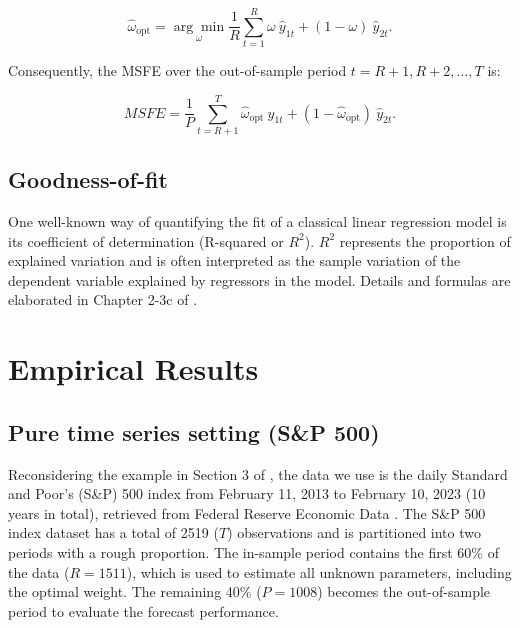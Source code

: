 \documentclass{monashthesis}
\begin{document}
\begin{equation}
\label{eqn:MSFE2}
\hat{\omega}_{\text{opt}} = \underset{\omega}{\arg\min} \frac{1}{R} \sum^R_{t=1} \omega \ \hat y_{1t} + (1-\omega) \ \hat y_{2t}.
\end{equation}

Consequently, the MSFE over the out-of-sample period \(t = R+1, R+2, \dots, T\) is:

\begin{equation}
\label{eqn:MSFE3}
MSFE = \frac{1}{P} \sum^T_{t = R+1} \hat{\omega}_{\text{opt}} \ \hat y_{1t} + (1-\hat{\omega}_{\text{opt}}) \ \hat y_{2t}.
\end{equation}

\hypertarget{goodness-of-fit}{%
\section{Goodness-of-fit}\label{goodness-of-fit}}

One well-known way of quantifying the fit of a classical linear regression model is its coefficient of determination (R-squared or \(R^2\)). \(R^2\) represents the proportion of explained variation and is often interpreted as the sample variation of the dependent variable explained by regressors in the model. Details and formulas are elaborated in Chapter 2-3c of \textcite{W15}.

\hypertarget{empirical-results}{%
\chapter{Empirical Results}\label{empirical-results}}

\hypertarget{sp500}{%
\section{Pure time series setting (S\&P 500)}\label{sp500}}

Reconsidering the example in Section 3 of \textcite{GA11}, the data we use is the daily Standard and Poor's (S\&P) 500 index from February 11, 2013 to February 10, 2023 (10 years in total), retrieved from Federal Reserve Economic Data \autocite{SP500}. The S\&P 500 index dataset has a total of 2519 (\(T\)) observations and is partitioned into two periods with a rough proportion. The in-sample period contains the first 60\% of the data (\(R = 1511\)), which is used to estimate all unknown parameters, including the optimal weight. The remaining 40\% (\(P = 1008\)) becomes the out-of-sample period to evaluate the forecast performance.
\end{document}
